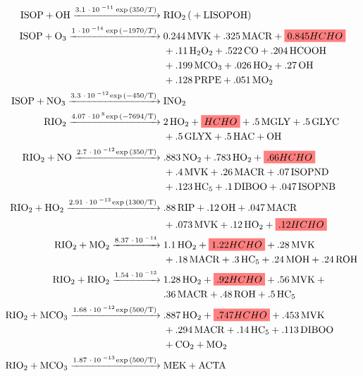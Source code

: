     \begin{subequations}
    \label{Model:GC:mechanisms:eqn_mechanisms}
    \begin{align} %
    \ce{
      ISOP + OH ->[3.1*10^{-11} \exp{(350/T})] 
        & RIO2 ( + LISOPOH) \label{mech1}  \\ 
      ISOP + O3 ->[1*10^{-14} \exp{(-1970/T})] 
        & 0.244MVK + .325MACR + \highlight{0.845HCHO} \notag \\
        & + .11H2O2 + .522CO + .204HCOOH \notag \\
        & + .199MCO3 +.026HO2 + .27OH \notag \\
        & + .128PRPE + .051MO2  \label{mech2} \\ 
      ISOP + NO3 ->[3.3*10^{-12} \exp{(-450/T)}] 
        & INO2 \label{mech3} \\
      RIO2 ->[4.07*10^{8} \exp{(-7694/T)}] 
        & 2HO2 + \highlight{HCHO} + .5MGLY + .5GLYC \notag \\
        & + .5GLYX + .5HAC + OH \label{mech4} \\
      RIO2 + NO ->[2.7*10^{-12} \exp{(350/T)}] 
        & .883NO2 + .783HO2 + \highlight{.66HCHO} \notag \\
        & + .4MVK + .26MACR + .07ISOPND \notag \\
        & + .123HC5 + .1DIBOO + .047ISOPNB \label{mech5} \\
      RIO2 + HO2 ->[2.91*10^{-13} \exp{(1300/T)}] 
        & .88RIP + .12OH + .047 MACR \notag \\
        & + .073MVK + .12HO2 + \highlight{.12HCHO} \label{mech6} \\
      RIO2 + MO2 ->[8.37*10^{-14}] 
        & 1.1HO2 + \highlight{1.22HCHO} + .28MVK  \notag\\
        & + .18MACR + .3HC5 + .24MOH + .24ROH \label{mech7} \\
      RIO2 + RIO2 ->[1.54*10^{-13}] 
        & 1.28HO2 + \highlight{.92HCHO} + .56MVK + \notag \\
        & .36MACR + .48ROH + .5HC5 \label{mech8} \\
      RIO2 + MCO3 ->[1.68*10^{-12} \exp{(500/T)}] 
        & .887HO2 + \highlight{.747HCHO} + .453MVK  \notag  \\
        & +.294MACR + .14HC5 + .113DIBOO  \notag  \\
        & + CO2 + MO2 \label{mech9}  \\
      RIO2 + MCO3 ->[1.87*10^{-13} \exp{(500/T)}] 
        & MEK + ACTA  \label{mech10} 
    }
    \end{align} \end{subequations} 
    
